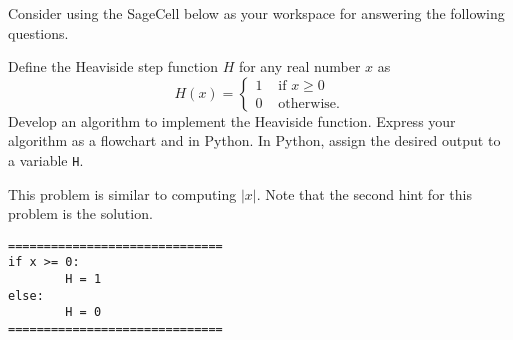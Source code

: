 \documentclass{ximera}
\begin{document}
Consider using the SageCell below as your workspace for answering the following questions.

\begin{question}
Define the Heaviside step function $H$ for any real number $x$ as
	$$H(x)=\begin{cases} 1 &\text{ if $x\geq 0$}\\
		0 &\text{ otherwise.}
	\end{cases}$$
Develop an algorithm to implement the Heaviside function. Express your algorithm as a flowchart and in Python. In Python, assign the desired output to a variable \verb|H|.
	\begin{hint}
		This problem is similar to computing $|x|$. Note that the second hint for this problem is the solution.
	\end{hint}
	\begin{hint}
	\begin{center}
	\end{center}
\begin{verbatim}
==============================
if x >= 0:
        H = 1
else:
        H = 0
==============================
\end{verbatim}
	\end{hint}
\end{question}
\end{document}
